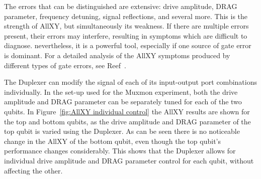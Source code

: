         The errors that can be distinguished are extensive: drive amplitude, DRAG parameter, frequency detuning, signal reflections, and several more. This is the strength of AllXY, but simultaneously its weakness. If there are multiple errors present, their errors may interfere, resulting in symptoms which are difficult to diagnose. nevertheless, it is a powerful tool, especially if one source of gate error is dominant. For a detailed analysis of the AllXY symptoms produced by different types of gate errors, see Reef~\cite{Reed}.

      The Duplexer can modify the signal of each of its input-output port combinations individually. In the set-up used for the Muxmon experiment, both the drive amplitude and DRAG parameter can be separately tuned for each of the two qubits. In Figure~\ref{fig:AllXY individual control} the AllXY results are shown for the top and bottom qubits, as the drive amplitude and DRAG parameter of the top qubit is varied using the Duplexer. As can be seen there is no noticeable change in the AllXY of the bottom qubit, even though the top qubit's performance changes considerably. This shows that the Duplexer allows for individual drive amplitude and DRAG parameter control for each qubit, without affecting the other.


